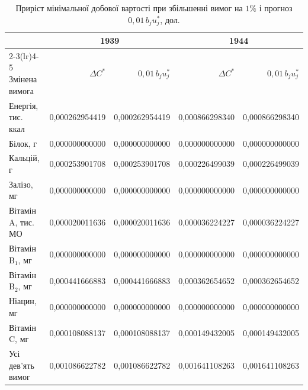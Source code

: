 \begin{table}[htbp]
\centering\footnotesize
\caption{Приріст мінімальної добової вартості при збільшенні вимог на $1\%$ і прогноз $0{,}01\,b_ju_j^*$, дол.}
\label{tab:glpk-sensitivity}
\begin{tabular}{lrrrr}
\toprule
 & \multicolumn{2}{c}{1939} & \multicolumn{2}{c}{1944} \\
\cmidrule(lr){2-3}\cmidrule(lr){4-5}
Змінена вимога & $\Delta C^*$ & $0{,}01\,b_ju_j^*$ & $\Delta C^*$ & $0{,}01\,b_ju_j^*$ \\
\midrule
Енергія, тис. ккал & 0{,}000262954419 & 0{,}000262954419 & 0{,}000866298340 & 0{,}000866298340 \\
Білок, г & 0{,}000000000000 & 0{,}000000000000 & 0{,}000000000000 & 0{,}000000000000 \\
Кальцій, г & 0{,}000253901708 & 0{,}000253901708 & 0{,}000226499039 & 0{,}000226499039 \\
Залізо, мг & 0{,}000000000000 & 0{,}000000000000 & 0{,}000000000000 & 0{,}000000000000 \\
Вітамін A, тис. МО & 0{,}000020011636 & 0{,}000020011636 & 0{,}000036224227 & 0{,}000036224227 \\
Вітамін B$_1$, мг & 0{,}000000000000 & 0{,}000000000000 & 0{,}000000000000 & 0{,}000000000000 \\
Вітамін B$_2$, мг & 0{,}000441666883 & 0{,}000441666883 & 0{,}000362654652 & 0{,}000362654652 \\
Ніацин, мг & 0{,}000000000000 & 0{,}000000000000 & 0{,}000000000000 & 0{,}000000000000 \\
Вітамін C, мг & 0{,}000108088137 & 0{,}000108088137 & 0{,}000149432005 & 0{,}000149432005 \\
\midrule
Усі дев’ять вимог & 0{,}001086622782 & 0{,}001086622782 & 0{,}001641108263 & 0{,}001641108263 \\
\bottomrule
\end{tabular}
\end{table}
